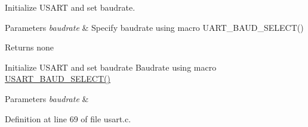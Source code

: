 Initialize U\-S\-A\-R\-T and set baudrate. 


\begin{DoxyParams}{Parameters}
{\em baudrate} & Specify baudrate using macro U\-A\-R\-T\-\_\-\-B\-A\-U\-D\-\_\-\-S\-E\-L\-E\-C\-T() \\
\hline
\end{DoxyParams}
\begin{DoxyReturn}{Returns}
none
\end{DoxyReturn}
Initialize U\-S\-A\-R\-T and set baudrate Baudrate using macro \hyperlink{group__pfleury__uart_ga81b884d0763f1925a0efeac39322413d}{U\-S\-A\-R\-T\-\_\-\-B\-A\-U\-D\-\_\-\-S\-E\-L\-E\-C\-T()} 
\begin{DoxyParams}{Parameters}
{\em baudrate} & \\
\hline
\end{DoxyParams}


Definition at line 69 of file usart.\-c.


